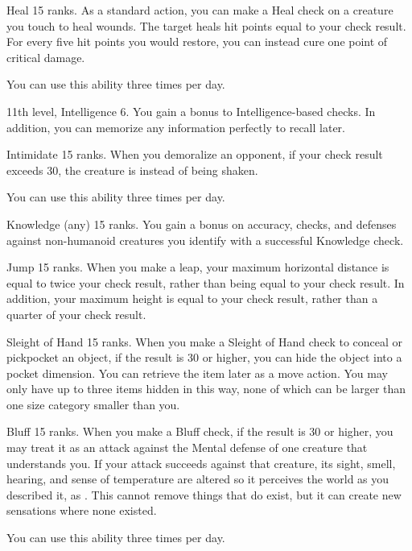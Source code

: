 \featpre Heal 15 ranks.
\featben As a standard action, you can make a Heal check on a creature you touch to heal wounds.
The target heals hit points equal to your check result.
For every five hit points you would restore, you can instead cure one point of critical damage.

You can use this ability three times per day.

\featpres 11th level, Intelligence 6.
\featben You gain a  bonus to Intelligence-based checks.
In addition, you can memorize any information perfectly to recall later.

\featpre Intimidate 15 ranks.
\featben When you demoralize an opponent, if your check result exceeds 30, the creature is \panicked instead of being shaken.

You can use this ability three times per day.

\featpre Knowledge (any) 15 ranks.
\featben You gain a  bonus on accuracy, checks, and defenses against non-humanoid creatures you identify with a successful Knowledge check.

\featpre Jump 15 ranks.
\featben When you make a leap, your maximum horizontal distance is equal to twice your check result, rather than being equal to your check result.
In addition, your maximum height is equal to your check result, rather than a quarter of your check result.

\featpre Sleight of Hand 15 ranks.
\featben When you make a Sleight of Hand check to conceal or pickpocket an object, if the result is 30 or higher, you can hide the object into a pocket dimension.
You can retrieve the item later as a move action.
You may only have up to three items hidden in this way, none of which can be larger than one size category smaller than you.

\featpre Bluff 15 ranks.
\featben When you make a Bluff check, if the result is 30 or higher, you may treat it as an attack against the Mental defense of one creature that understands you.
If your attack succeeds against that creature, its sight, smell, hearing, and sense of temperature are altered so it perceives the world as you described it, as .
This cannot remove things that do exist, but it can create new sensations where none existed.

You can use this ability three times per day.

